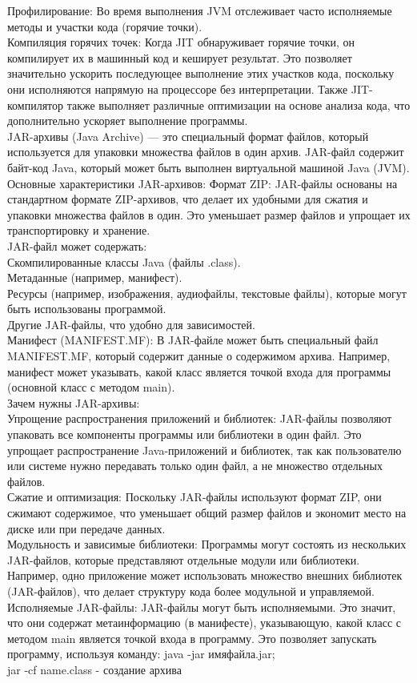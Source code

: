 {Профилирование: Во время выполнения JVM отслеживает часто исполняемые методы и участки кода (горячие точки). \\
Компиляция горячих точек: Когда JIT обнаруживает горячие точки, он компилирует их в машинный код и кеширует результат. Это позволяет значительно ускорить последующее выполнение этих участков кода, поскольку они исполняются напрямую на процессоре без интерпретации. Также JIT-компилятор также выполняет различные оптимизации на основе анализа кода, что дополнительно ускоряет выполнение программы. \\
JAR-архивы (Java Archive) — это специальный формат файлов, который используется для упаковки множества файлов в один архив. JAR-файл содержит байт-код Java, который может быть выполнен виртуальной машиной Java (JVM). \\
Основные характеристики JAR-архивов:
Формат ZIP: JAR-файлы основаны на стандартном формате ZIP-архивов, что делает их удобными для сжатия и упаковки множества файлов в один. Это уменьшает размер файлов и упрощает их транспортировку и хранение.\\
JAR-файл может содержать:\\
Скомпилированные классы Java (файлы .class). \\
Метаданные (например, манифест).\\
Ресурсы (например, изображения, аудиофайлы, текстовые файлы), которые могут быть использованы программой.\\
Другие JAR-файлы, что удобно для зависимостей.\\
Манифест (MANIFEST.MF): В JAR-файле может быть специальный файл MANIFEST.MF, который содержит данные о содержимом архива. Например, манифест может указывать, какой класс является точкой входа для программы (основной класс с методом main).\\
Зачем нужны JAR-архивы:\\
Упрощение распространения приложений и библиотек: JAR-файлы позволяют упаковать все компоненты программы или библиотеки в один файл. Это упрощает распространение Java-приложений и библиотек, так как пользователю или системе нужно передавать только один файл, а не множество отдельных файлов. \\
Сжатие и оптимизация: Поскольку JAR-файлы используют формат ZIP, они сжимают содержимое, что уменьшает общий размер файлов и экономит место на диске или при передаче данных. \\
Модульность и зависимые библиотеки: Программы могут состоять из нескольких JAR-файлов, которые представляют отдельные модули или библиотеки. Например, одно приложение может использовать множество внешних библиотек (JAR-файлов), что делает структуру кода более модульной и управляемой. \\
Исполняемые JAR-файлы: JAR-файлы могут быть исполняемыми. Это значит, что они содержат метаинформацию (в манифесте), указывающую, какой класс с методом main является точкой входа в программу. Это позволяет запускать программу, используя команду: java -jar имяфайла.jar; \\
jar -cf name.class - создание архива} \\  
